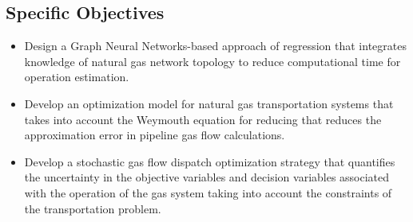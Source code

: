 \subsection{Specific Objectives}
\begin{itemize}

\item Design a Graph Neural Networks-based approach of regression that integrates knowledge of natural gas network topology to reduce computational time for operation estimation.

\item Develop an optimization model for natural gas transportation systems that takes into account the Weymouth equation for reducing that reduces the approximation error in pipeline gas flow calculations.

\item Develop a stochastic gas flow dispatch optimization strategy that quantifies the uncertainty in the objective variables and decision variables associated with the operation of the gas system taking into account the constraints of the transportation problem.

\end{itemize}


